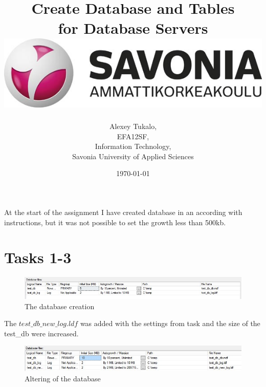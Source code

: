 \documentclass[english]{article}
\date{}
\begin{document}
\title{\vspace{2in}Create Database and Tables\\
\small for Database Servers\\
\vspace{0.5in}\includegraphics{savonia.jpg}}

\nopagebreak
\maketitle


\vspace{3in}

\author{
\begin{flushright}
Alexey Tukalo,\\
EFA12SF,\\
Information Technology,\\
Savonia University of Applied Sciences
\end{flushright}
}

\date{\today}
\thispagestyle{empty}

\newpage
\setcounter{page}{1}
\setcounter{tocdepth}{2}



At the start of the assignment I have created database in an according with instructions, but it was not possible to set the growth less than 500kb.
\section{Tasks 1-3}
\begin{figure}[hb]
\centerline{\includegraphics[scale=0.6]{SQLCreateDB/createBD}}
\caption{The database creation}
\end{figure}
The $test\_db\_new\_log.ldf$ was added with the settings from task and the size of the test\_db were increased.
\begin{figure}[hb]
\centerline{\includegraphics[scale=0.65]{SQLCreateDB/alterBD1}}
\caption{Altering of the database}
\end{figure}
\end{document}
